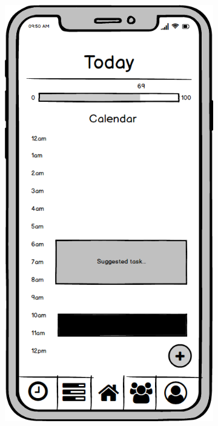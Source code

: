 \begin{figure}
    \centering
    \begin{subfigure}[b]{0.3\textwidth}
        \centering
        \includegraphics[width=\textwidth]{./graphics/design/Dashboard (Today Calendar View).png}

\end{subfigure}
\end{figure}
